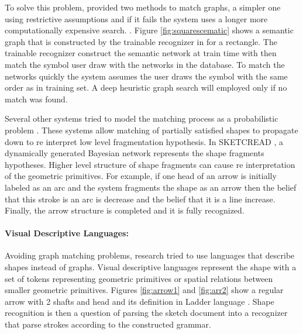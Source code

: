  To solve this problem, \cite{mulitstroke5} provided two methods to match graphs, a simpler one using restrictive assumptions and if it fails the system uses a longer more computationally expensive search.  . Figure \ref{fig:squarescematic} shows a semantic graph that is constructed by the trainable recognizer in   \cite{mulitstroke5} for a rectangle. The trainable recognizer construct the semantic network at train time with then match the symbol user draw with the networks in the database. To match the networks quickly the system assumes the user draws the symbol with the same order as in training set. A deep heuristic graph search will employed only if no match was found. %


 Several other systems tried to model the matching process as a probabilistic problem \cite{HMM53,SketchRead2007}. These systems allow matching of partially satisfied shapes to propagate down to re interpret low level fragmentation hypothesis. In SKETCREAD \cite{SketchRead2007}, a dynamically generated Bayesian network represents the shape fragments hypotheses. Higher level structure of shape fragments can cause re interpretation of the geometric primitives. For example, if one head of an arrow is initially labeled as an arc and the system fragments the shape as an arrow then the belief that this stroke is an arc is decrease and the belief that it is a line increase. Finally, the arrow structure is completed and it is fully recognized. 
 
 \paragraph{Visual Descriptive Languages:}
 \label{sec:VisualDescribtiveLanguages}
 
 Avoiding graph matching problems, research tried to use languages that describe shapes instead of graphs. Visual descriptive languages represent the shape with a set of  tokens representing geometric primitives or spatial relations between smaller geometric primitives. Figures \ref{fig:arrow1} and \ref{fig:arr2} show a regular arrow with 2 shafts and head and its definition in Ladder language \cite{Ladder30}. Shape recognition is then a question of parsing the sketch document into a recognizer that parse strokes according to the constructed grammar. 
 
